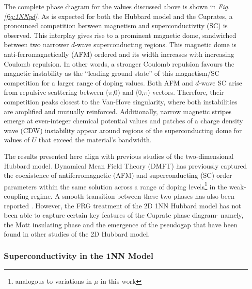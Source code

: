 \documentclass[11pt]{article}
\begin{document}
\medskip
\noindent The complete phase diagram for the values discussed above is shown in \textit{Fig.\ref{fig:1NNpd}}. As is expected
for both the Hubbard model and the Cuprates\cite{kivelson1998electronic,fradkin2015colloquium,vanhala2018dynamical}, a pronounced competition between magnetism and 
superconductivity (SC) is observed. This interplay gives rise to a prominent magnetic dome, sandwiched between two narrower $d$-wave superconducting regions. This magnetic dome is 
anti-ferromagnetically (AFM) ordered and its width increases with increasing Coulomb repulsion. In other words, a stronger Coulomb repulsion favours the magnetic instability as the ``leading ground state'' of this magnetism/SC competition 
for a larger range of doping values. Both AFM and $d$-wave SC arise from repulsive scattering between
($\pi$,0) and (0,$\pi$) vectors. Therefore, their competition peaks closest to the Van-Hove singularity, where both instabilities are amplified and mutually reinforced\cite{furukawa1998truncation,honerkamp2001temperature}.
Additionally, narrow magnetic stripes emerge at even-integer chemical potential values and
patches of a charge density wave (CDW) instability appear around regions of the superconducting dome for values of $U$ that exceed
the material's bandwidth.\par



\medskip

\noindent The results presented here align with previous studies of the two-dimensional Hubbard model. Dynamical Mean Field Theory (DMFT) has 
previously captured the coexistence of antiferromagnetic (AFM) and superconducting (SC) order parameters within the same solution across a range of doping levels\footnote{analogous to variations in 
$\mu$ in this work} in the weak-coupling regime\cite{capone2006competition}. A smooth transition between these two phases has also been reported \cite{capone2006competition}. However, the FRG treatment of the 2D 1NN Hubbard model has not been able to capture certain key features
of the Cuprate phase diagram- namely, the Mott insulating phase and the emergence of the pseudogap that have been found in other studies of the 2D Hubbard model\cite{katanin2009comparing,otsuki2014superconductivity}.






\subsubsection{Superconductivity in the 1NN Model}
\end{document}

